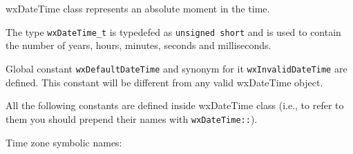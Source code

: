 
\section{}\label{wxdatetime}

wxDateTime class represents an absolute moment in the time.


The type {\tt wxDateTime\_t} is typedefed as {\tt unsigned short} and is used
to contain the number of years, hours, minutes, seconds and milliseconds.


Global constant {\tt wxDefaultDateTime} and synonym for it {\tt wxInvalidDateTime} are defined. This constant will be different from any valid
wxDateTime object.

All the following constants are defined inside wxDateTime class (i.e., to refer to
them you should prepend their names with {\tt wxDateTime::}).

Time zone symbolic names:

